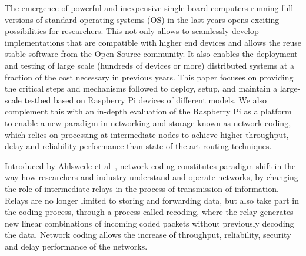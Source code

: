 %

The emergence of powerful and inexpensive single-board computers
running full versions of standard operating systems (OS) in the last
years opens exciting possibilities for researchers. This not only
allows to seamlessly develop implementations that are compatible with
higher end devices and allows the reuse stable software from the Open
Source community. It also enables the deployment and testing of large
scale (hundreds of devices or more) distributed systems at a fraction
of the cost necessary in previous years. This paper focuses on
providing the critical steps and mechanisms followed to deploy, setup,
and maintain a large-scale testbed based on Raspberry Pi devices of
different models. We also complement this with an in-depth evaluation
of the Raspberry Pi as a platform to enable a new paradigm in
networking and storage known as network coding, which relies on
processing at intermediate nodes to achieve higher throughput, delay
and reliability performance than state-of-the-art routing techniques.


Introduced by Ahlswede et al~\cite{ahlswede2000network}, network
coding constitutes paradigm shift in the way how researchers and
industry understand and operate networks, by changing the role of
intermediate relays in the process of transmission of information.
Relays are no longer limited to storing and forwarding data, but also
take part in the coding process, through a process called recoding,
where the relay generates new linear combinations of incoming coded
packets without previously decoding the data. Network coding allows
the increase of throughput, reliability, security and delay
performance of the networks. 

